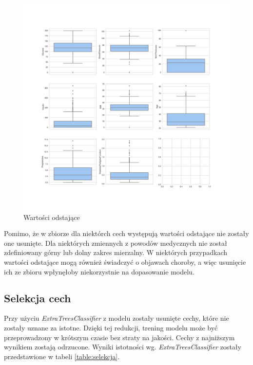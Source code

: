 \documentclass[12pt]{article}
\begin{document}
\begin{figure}
	\begin{adjustwidth}{-3.3cm}{}
		\centering
		\includegraphics[width=1.5\textwidth]{images/boxplots.jpg}
		\caption{Wartości odstające}
		\label{fig:outliers}
	\end{adjustwidth}
\end{figure}

Pomimo, że w zbiorze dla niektórch cech występują wartości odstające nie zostały one usunięte. Dla niektórych zmiennych z powodów medycznych nie został zdefiniowany górny lub dolny zakres mierzalny. W niektórych przypadkach wartości odstające mogą również świadczyć o objawach choroby, a więc usunięcie ich ze zbioru wpłynęłoby niekorzystnie na dopasowanie modelu.

\subsection{Selekcja cech}


Przy użyciu \textit{ExtraTreesClassifier} z modelu zostały usunięte cechy, które nie zostały uznane za istotne. Dzięki tej redukcji, trening modelu może być przeprowadzony w krótszym czasie bez straty na jakości. Cechy z najniższym wynikiem zostają odrzucone. Wyniki istotności wg. \textit{ExtraTreesClassifier} zostały przedstawione w tabeli \ref{table:selekcja}.
	
\end{document}
